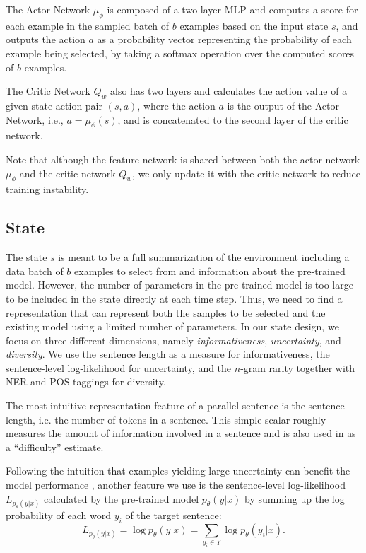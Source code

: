 \documentclass[letterpaper]{article}
\begin{document}
The Actor Network $\mu_\phi$ is composed of a two-layer MLP and computes a score for each example in the sampled batch of $b$ examples based on the input state $s$, and outputs the action $a$ as a probability vector representing the probability of each example being selected, by taking a softmax operation over the computed scores of $b$ examples.

The Critic Network $Q_w$ also has two layers and calculates the action value of a given state-action pair $(s,a)$, where the action $a$ is the output of the Actor Network, i.e., $a=\mu_\phi(s)$, and is concatenated to the second layer of the critic network.

Note that although the feature network is shared between both the actor network $\mu_\phi$ and the critic network $Q_w$, we only update it with the critic network to reduce training instability.

\subsection{State}
\label{subsec:state}

The state $s$ is meant to be a full summarization of the environment including a data batch of $b$ examples to select from and information about the pre-trained model. However, the number of parameters in the pre-trained model is too large to be included in the state directly at each time step. Thus, we need to find a representation that can represent both the samples to be selected and the existing model using a limited number of parameters. In our state design, we focus on three different dimensions, namely \emph{informativeness}, \emph{uncertainty}, and \emph{diversity}. We use the sentence length as a measure for informativeness, the sentence-level log-likelihood for uncertainty, and the $n$-gram rarity together with NER and POS taggings for diversity.

The most intuitive representation feature of a parallel sentence is the sentence length, i.e. the number of tokens in a sentence. This simple scalar roughly measures the amount of information involved in a sentence and is also used in \cite{platanios2019competence} as a ``difficulty'' estimate. 

Following the intuition that examples yielding large uncertainty can benefit the model performance \cite{li2006confidence}, another feature we use is the sentence-level log-likelihood $L_{p_\theta(y|x)}$ calculated by the pre-trained model $p_\theta(y|x)$ by summing up the log probability of each word $y_i$ of the target sentence:
\begin{equation}
	\label{eq:logp}
	L_{p_{\theta}(y|x)} = \log p_\theta(y|x) = \sum_{y_i \in Y} \log p_\theta(y_i|x).
\end{equation}
\end{document}
